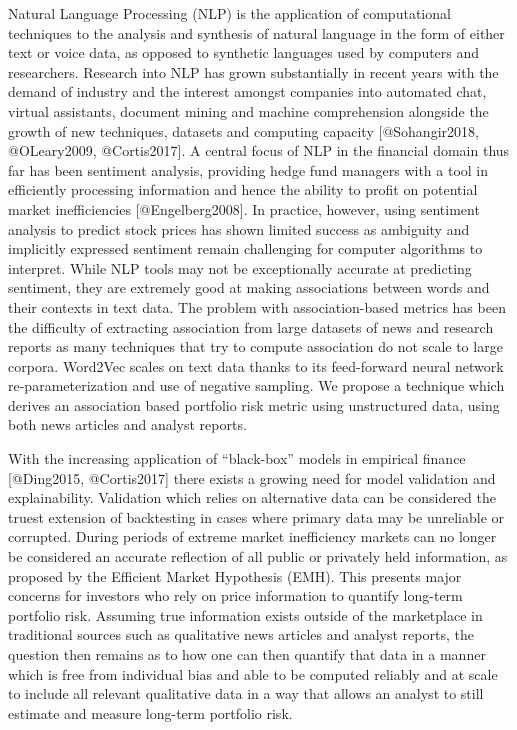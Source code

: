 \documentclass[11pt]{article}
\begin{document}
Natural Language Processing (NLP) is the application of computational
techniques to the analysis and synthesis of natural language in the form
of either text or voice data, as opposed to synthetic languages used by
computers and researchers. Research into NLP has grown substantially in
recent years with the demand of industry and the interest amongst
companies into automated chat, virtual assistants, document mining and
machine comprehension alongside the growth of new techniques, datasets
and computing capacity {[}@Sohangir2018, @OLeary2009, @Cortis2017{]}. A
central focus of NLP in the financial domain thus far has been sentiment
analysis, providing hedge fund managers with a tool in efficiently
processing information and hence the ability to profit on potential
market inefficiencies {[}@Engelberg2008{]}. In practice, however, using
sentiment analysis to predict stock prices has shown limited success as
ambiguity and implicitly expressed sentiment remain challenging for
computer algorithms to interpret. While NLP tools may not be
exceptionally accurate at predicting sentiment, they are extremely good
at making associations between words and their contexts in text data.
The problem with association-based metrics has been the difficulty of
extracting association from large datasets of news and research reports
as many techniques that try to compute association do not scale to large
corpora. Word2Vec scales on text data thanks to its feed-forward neural
network re-parameterization and use of negative sampling. We propose a
technique which derives an association based portfolio risk metric using
unstructured data, using both news articles and analyst reports.

With the increasing application of ``black-box'' models in empirical
finance {[}@Ding2015, @Cortis2017{]} there exists a growing need for
model validation and explainability. Validation which relies on
alternative data can be considered the truest extension of backtesting
in cases where primary data may be unreliable or corrupted. During
periods of extreme market inefficiency markets can no longer be
considered an accurate reflection of all public or privately held
information, as proposed by the Efficient Market Hypothesis (EMH). This
presents major concerns for investors who rely on price information to
quantify long-term portfolio risk. Assuming true information exists
outside of the marketplace in traditional sources such as qualitative
news articles and analyst reports, the question then remains as to how
one can then quantify that data in a manner which is free from
individual bias and able to be computed reliably and at scale to include
all relevant qualitative data in a way that allows an analyst to still
estimate and measure long-term portfolio risk.
\end{document}
